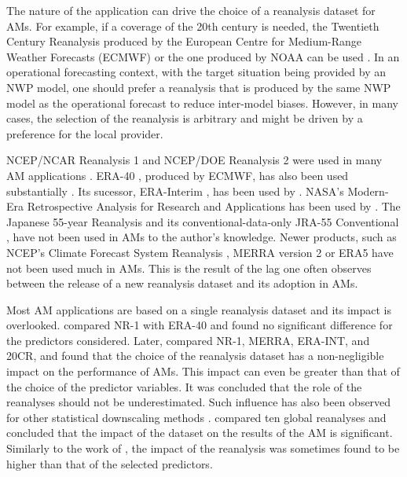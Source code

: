 \documentclass[alpha-refs]{wiley-article}
\begin{document}
The nature of the application can drive the choice of a reanalysis dataset for AMs. For example, if a coverage of the 20th century is needed, the Twentieth Century Reanalysis produced by the European Centre for Medium-Range Weather Forecasts (ECMWF) \citep[ERA-20C or CERA-20C --][]{Poli2016, Laloyaux2016} or the one \citep[20CR --][]{Compo2011} produced by NOAA can be used \citep[for example,][]{Kuentz2015, Caillouet2016, Brigode2016, Bonnet2017}. In an operational forecasting context, with the target situation being provided by an NWP model, one should prefer a reanalysis that is produced by the same NWP model as the operational forecast to reduce inter-model biases. However, in many cases, the selection of the reanalysis is arbitrary and might be driven by a preference for the local provider.  

NCEP/NCAR Reanalysis 1 \citep[NR-1 --][]{Kalnay1996, Kistler2001} and NCEP/DOE Reanalysis 2 \citep[NR-2 --][]{Kanamitsu2002} were used in many AM applications \citep[e.g.][]{Timbal2003, Altava-Ortiz2006, Matulla2007, Yiou2014}. ERA-40 \citep{Uppala2005}, produced by ECMWF, has also been used substantially \citep[e.g.][] {Willems2011b, Radanovics2013, Chardon2014, BenDaoud2016}. Its sucessor, ERA-Interim \citep[ERA-INT --][]{Dee2011a}, has been used by \cite{Raynaud2016b}. NASA's Modern-Era Retrospective Analysis for Research and Applications \citep[MERRA -- ][]{Rienecker2011} has been used by \citet{Vanvyve2015}. The Japanese 55-year Reanalysis \citep[JRA-55 --][]{Kobayashi2015, Harada2016} and its conventional-data-only JRA-55 Conventional \citep[JRA-55C --][]{Kobayashi2014}, have not been used in AMs to the author’s knowledge. Newer products, such as NCEP's Climate Forecast System Reanalysis \citep[CFSR --][]{Saha2010a}, MERRA version 2 \citep[MERRA-2 -- ][]{Gelaro2017} or ERA5 \citep{Hersbach2019} have not been used much in AMs. This is the result of the lag one often observes between the release of a new reanalysis dataset and its adoption in AMs.

Most AM applications are based on a single reanalysis dataset and its impact is overlooked. \citet{BenDaoud2009} compared NR-1 with ERA-40 and found no significant difference for the predictors considered. Later, \citet{Dayon2015} compared NR-1, MERRA, ERA-INT, and 20CR, and found that the choice of the reanalysis dataset has a non-negligible impact on the performance of AMs. This impact can even be greater than that of the choice of the predictor variables. It was concluded that the role of the reanalyses should not be underestimated. Such influence has also been observed for other statistical downscaling methods \citep[e.g.][]{Koukidis2009}. \citet{Horton2018b} compared ten global reanalyses and concluded that the impact of the dataset on the results of the AM is significant. Similarly to the work of \citet{Dayon2015}, the impact of the reanalysis was sometimes found to be higher than that of the selected predictors. 
\end{document}
